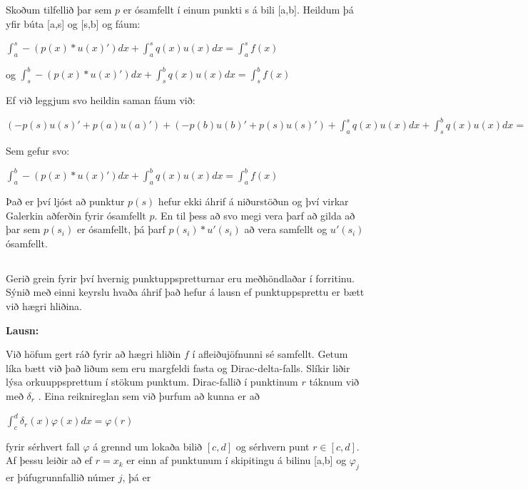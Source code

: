 \documentclass[11pt,a4paper,titlepage]{article}
\begin{document}
Skoðum tilfellið þar sem $p$ er ósamfellt í einum punkti s á bili [a,b].
Heildum þá yfir búta [a,s] og [s,b] og fáum:\par
\begin{center}
	$\int_{a}^{s}-(p(x)*u{(x)}')dx + \int_{a}^{s}q(x)u(x)dx= \int_{a}^{s}f(x)$ \par
	og $\int_{s}^{b}-(p(x)*u{(x)}')dx + \int_{s}^{b}q(x)u(x)dx= \int_{s}^{b}f(x)$
\end{center}
Ef við leggjum svo heildin saman fáum við:\par
\begin{center}
	$(-p(s)u{(s)}'+p(a)u{(a)}')+(-p(b)u{(b)}'+p(s)u{(s)}')+ \int_{a}^{s}q(x)u(x)dx+ \int_{s}^{b}q(x)u(x)dx =\int_{a}^{s}f(x)+\int_{s}^{b}f(x)$
\end{center}
Sem gefur svo: 
\begin{center}
	$\int_{a}^{b}-(p(x)*u{(x)}')dx + \int_{a}^{b}q(x)u(x)dx= \int_{a}^{b}f(x)$
\end{center} \par
Það er því ljóst að punktur $p(s)$ hefur ekki áhrif á niðurstöðun og því virkar Galerkin aðferðin fyrir ósamfellt $p$. 
En til þess að svo megi vera þarf að gilda að þar sem $p(s_{i})$ er ósamfellt, þá þarf $p(s_{i})*u'(s_{i})$ að vera samfellt og $u'(s_{i})$ ósamfellt.


\subsection{}
Gerið grein fyrir því hvernig punktuppspretturnar eru meðhöndlaðar í forritinu. Sýnið með einni keyrslu hvaða áhrif það hefur á lausn ef punktuppsprettu er bætt við hægri hliðina. 

\par
\textbf{Lausn:} \par
Við höfum gert ráð fyrir að hægri hliðin $f$ í afleiðujöfnunni sé samfellt. Getum líka bætt við það liðum sem eru margfeldi fasta og Dirac-delta-falls. Slíkir liðir lýsa orkuuppsprettum í stökum punktum.  Dirac-fallið í punktinum $r$ táknum við með $\delta _{r}$ . Eina reiknireglan sem við þurfum að kunna er að 

\begin{center}$\int_{c}^{d}\delta _{r}(x) \varphi (x)dx=\varphi(r)$\end{center}

fyrir sérhvert fall $\varphi$ á grennd um lokaða bilið $[c,d]$ og sérhvern punt $r\in[c,d]$. Af þessu leiðir að ef $r=x_{k}$ er einn af punktunum í skipitingu á bilinu [a,b] og $\varphi_{j}$ er þúfugrunnfallið númer $j$, þá er 
\end{document}
